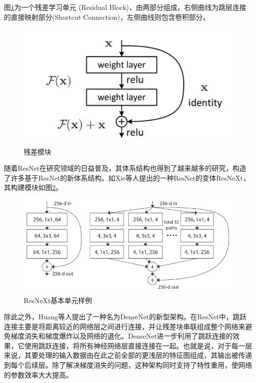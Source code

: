 图\ref{fig:f10}为一个残差学习单元 (Residual Block)，由两部分组成，右侧曲线为跳层连接的直接映射部分(Shortcut Connection)，左侧曲线则包含卷积部分。

\begin{figure}[h]
	\centering
	\includegraphics[scale=0.8]{figures/10.png}
	\caption{残差模块\textsuperscript{\cite{p29}}}
	\label{fig:f10}
\end{figure}

随着ResNet在研究领域的日益普及，其体系结构也得到了越来越多的研究，构造了许多基于ResNet的新体系结构。如Xie等人提出的一种ResNet的变体ResNeXt，其构建模块如图\ref{fig:f11}。

\begin{figure}[h]
	\centering
	\includegraphics[scale=0.7]{figures/11.png}
	\caption{ResNeXt基本单元样例\textsuperscript{\cite{p28}}}
	\label{fig:f11}
\end{figure}

除此之外，Huang等人提出了一种名为DenseNet的新型架构。在ResNet中，跳跃连接主要是将距离较近的网络层之间进行连接，并让残差块串联组成整个网络来避免梯度消失和梯度爆炸以及网络的退化。DenseNet进一步利用了跳跃连接的效果，它使用跳跃连接，将所有神经网络层直接连接在一起。也就是说，对于每一层来说，其要处理的输入数据由在此之前全部的更浅层的特征图组成，其输出被传递到每个后续层。除了解决梯度消失的问题，这种架构同时支持了特性重用，使网络的参数效率大大提高。



